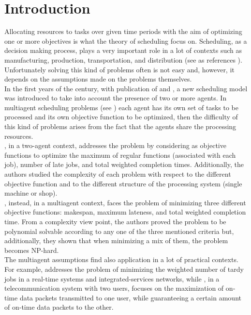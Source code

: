 \documentclass[opre,nonblindrev]{informs3} %
\begin{document}
\section{Introduction}
Allocating resources to tasks over given time periods with the aim of optimizing one or more objectives is what the theory of scheduling focus on. Scheduling, as a decision making process, plays a very important role in a lot of contexts such as manufacturing, production, transportation, and distribution (see as references \cite{pinedo09,pinedo16}). Unfortunately solving this kind of problems often is not easy and, however, it depends on the assumptions made on the problems themselves.\\
In the first years of the century, with publication of \cite{agnetis04} and \cite{baker2003}, a new scheduling model was introduced to take into account the presence of two or more agents. In multiagent scheduling problems (see \cite{agnetis-book14}) each agent has its own set of tasks to be processed and its own objective function to be optimized, then the difficulty of this kind of problems arises from the fact that the agents share the processing resources.\\
\cite{agnetis04}, in a two-agent context, addresses the problem by considering as objective functions to optimize the maximum of regular functions (associated with each job), number of late jobs, and total weighted completion times. Additionally, the authors studied the complexity of each problem with respect to the different objective function and to the different structure of the processing system (single machine or shop).\\
\cite{baker2003}, instead, in a multiagent context, faces the problem of minimizing three different objective functions: makespan, maximum lateness, and total weighted completion time. From a complexity view point, the authors proved the problem to be polynomial solvable according to any one of the three mentioned criteria but, additionally, they shown that when minimizing a mix of them, the problem becomes NP-hard. \\
The multiagent assumptions find also application in a lot of practical contexts. For example, \cite{Peha95} addresses the problem of minimizing the weighted number of tardy jobs in a real-time systems and integrated-services networks, while \cite{Arbib04}, in a  telecommunication system with two users, focuses on the maximization of on‐time data packets transmitted to one user, while guaranteeing a certain amount of on‐time data packets to the other.\\
\end{document}
